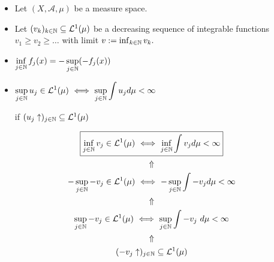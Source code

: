 \begin{minipage}[t]{0.45\textwidth}
\begin{given}
\begin{itemize}
\item  Let \((X,\mathcal{A},\mu )\) be a measure space.
\item  Let \((v_{k})_{k\in \Bbb{N}}\subseteq \mathcal{L}^1(\mu )\) be a decreasing sequence of integrable functions \(v_{1}\geq v_{2}\geq  \ldots  \) with limit \(v:=\inf_{k\in \Bbb{N}} v_k.\)
\end{itemize}
\end{given}

\begin{tools}
\begin{itemize}
\item \(\displaystyle
\inf_{j\in \Bbb{N}} f_{j}(x) = - \sup_{j\in \Bbb{N}} (-f_{j}(x))
\)
\item \(\displaystyle \sup_{j\in \Bbb{N}} u_{j} \in  \mathcal{L}^1(\mu )\ \Longleftrightarrow \  \sup_{j\in \Bbb{N}} \int  u_{j} d\mu <\infty  \) 

if  \( (u_{j}\uparrow )_{j\in \Bbb{N}}\subseteq \mathcal{L}^1(\mu ) 
\)


\end{itemize}
\end{tools}

\end{minipage}
\begin{minipage}[t]{0.55\textwidth}
\vspace{-0.1in}
\begin{gather*}
\boxed{\inf_{j\in \Bbb{N}} v_{j} \in  \mathcal{L}^1(\mu )\  \Longleftrightarrow \  \inf_{j\in \Bbb{N}} \int  v_{j} d\mu <\infty } \\
\Uparrow  \\
-\sup_{j\in \Bbb{N}} -v_{j} \in  \mathcal{L}^1(\mu )\  \Longleftrightarrow \  -\sup_{j\in \Bbb{N}} \int  -v_{j} d\mu <\infty \\
\Uparrow  \\
\sup_{j\in \Bbb{N}} -v_{j} \in  \mathcal{L}^1(\mu )\  \Longleftrightarrow \  \sup_{j\in \Bbb{N}} \int  -v_{j}\  d\mu <\infty  \\
\Uparrow  \\
(-v_{j} \uparrow )_{j\in \Bbb{N}} \subseteq \mathcal{L}^1(\mu )
\end{gather*}
\end{minipage}

\noindent\makebox[\linewidth]{\rule{\paperwidth}{0.4pt}}

